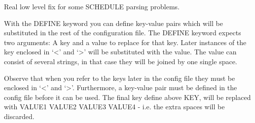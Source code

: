 \documentclass[letterpaper,10pt,english]{sphinxmanual}
\begin{document}
\label{\detokenize{keywords/index:add-fixed-length-schedule-kw}}
\begin{sphinxShadowBox}

Real low level fix for some SCHEDULE parsing problems.
\end{sphinxShadowBox}
\label{\detokenize{keywords/index:define}}
\begin{sphinxShadowBox}

With the DEFINE keyword you can define key-value pairs which will be
substituted in the rest of the configuration file. The DEFINE keyword expects
two arguments: A key and a value to replace for that key. Later instances of
the key enclosed in ‘\textless{}’ and ‘\textgreater{}’ will be substituted with the value. The value
can consist of several strings, in that case they will be joined by one single
space.


%
\begin{sphinxVerbatim}[commandchars=\\\{\}]
    
    
    
                                 

        
   
    
\end{sphinxVerbatim}

Observe that when you refer to the keys later in the config file they must be
enclosed in ‘\textless{}’ and ‘\textgreater{}’. Furthermore, a key-value pair must be defined in the
config file before it can be used. The final key define above KEY, will be
replaced with VALUE1 VALUE2 VALUE3 VALUE4 - i.e. the extra spaces will be
discarded.
\end{sphinxShadowBox}
\end{document}
